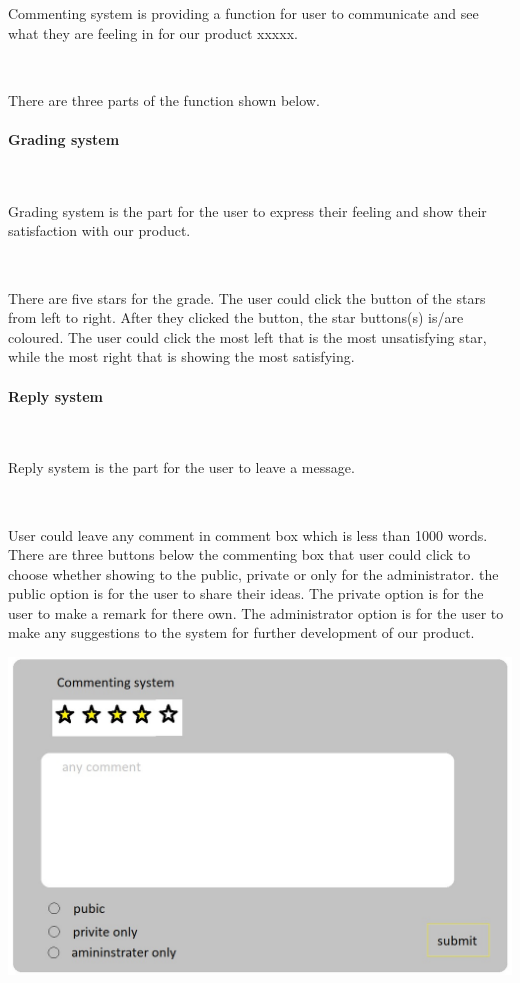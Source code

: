 Commenting system is providing a function for user to communicate and see what they are feeling in for our product xxxxx.\par~

There are three parts of the function shown below.

\paragraph{Grading system}~

Grading system is the part for the user to express their feeling and show their satisfaction with our product.\par~

There are five stars for the grade. The user could click the button of the stars from left to right. After they clicked the button, the star buttons(s) is/are coloured. The user could click the most left that is the most unsatisfying star, while the most right that is showing the most satisfying.

\paragraph{Reply system}~

Reply system is the part for the user to leave a message.\par~

User could leave any comment in comment box which is less than 1000 words. There are three buttons below the commenting box that user could click to choose whether showing to the public, private or only for the administrator. the public option is for the user to share their ideas. The private option is for the user to make a remark for there own. The administrator option is for the user to make any suggestions to the system for further development of our product.

\includegraphics[scale=0.5]{Doc/Graphics/sdfg}

